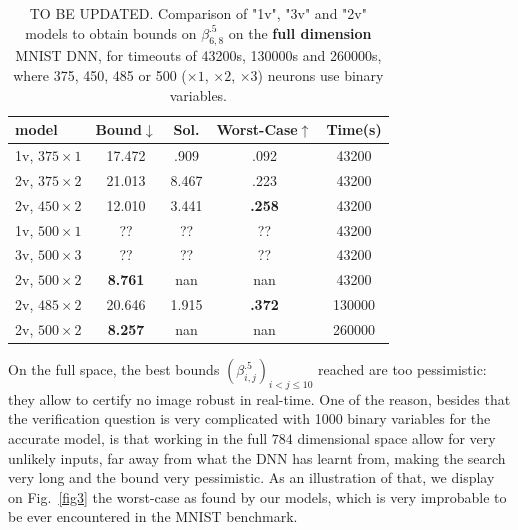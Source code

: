 	\begin{table}[h!]
	\begin{tabular}{|l|c|c|c|c|}\hline\hline
		model &        Bound$\downarrow$ &  Sol. &      Worst-Case$\uparrow$ &  Time(s) \\\hline \hline
		1v, $375 \times 1$ & 17.472 & .909 & .092 & 43200 \\\hline 
		2v, $375 \times 2$ & 21.013 & 8.467& .223 & 43200 \\\hline		
		2v, $450 \times 2$ & 12.010 & 3.441 & {\bf .258} & 43200 \\\hline
		1v, $500 \times 1$ & ?? & ?? & ?? & 43200 \\\hline 
		3v, $500 \times 3$ & ?? & ?? & ?? & 43200 \\\hline 
	 2v, $500 \times 2$ & {\bf 8.761} & nan & nan & 43200 \\\hline\hline

	 2v, $485 \times 2$ & 20.646 & 1.915 & {\bf .372} & 130000 \\\hline\hline

		 2v, $500 \times 2$ & {\bf 8.257} & nan & nan & 260000 \\\hline\hline
		 
	\end{tabular}
	\caption{TO BE UPDATED. Comparison of "1v", "3v" and "2v" models 
	to obtain bounds on $\beta^{.5}_{6,8}$ on the {\bf full dimension} MNIST DNN, for timeouts of 43200s, 130000s and 260000s, where 375, 450, 485 or 500 ($\times 1$, $\times 2$, $\times 3$) neurons use binary variables.}
	\label{table.mnist}
\end{table}

On the full space, the best bounds $(\beta^{.5}_{i,j})_{i < j \leq 10}$ reached are too pessimistic: they allow to certify no image robust in real-time. One of the reason, besides that the verification question is very complicated with 1000 binary variables for the accurate model, is that working in the full $784$ dimensional space allow for very unlikely inputs, far away from what the DNN has learnt from, making the search very long and the bound very pessimistic.
As an illustration of that, we display on Fig.~\ref{fig3} the worst-case as found by our models, which is very improbable to be ever encountered in the MNIST benchmark.

